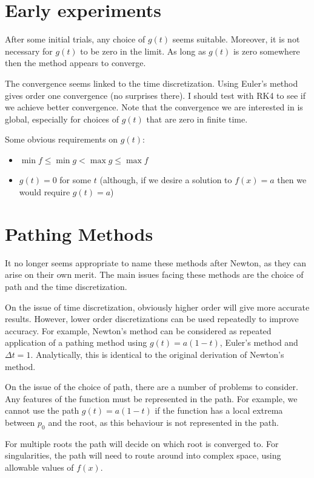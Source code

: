 \documentclass{book}
\begin{document}
\section{Early experiments}

After some initial trials, any choice of $g(t)$ seems suitable.
Moreover, it is not necessary for $g(t)$ to be zero in the limit.
As long as $g(t)$ is zero somewhere then the method appears to converge.

The convergence seems linked to the time discretization.
Using Euler's method gives order one convergence (no surprises there).
I should test with RK4 to see if we achieve better convergence.
Note that the convergence we are interested in is global, especially for choices of $g(t)$ that are zero in finite time.

Some obvious requirements on $g(t)$:
\begin{itemize}
\item $\min f \leq \min g < \max g \leq \max f$
\item $g(t) = 0$ for some $t$ (although, if we desire a solution to $f(x) = a$ then we would require $g(t) = a$)
\end{itemize}

\section{Pathing Methods}

It no longer seems appropriate to name these methods after Newton, as they can arise on their own merit.
The main issues facing these methods are the choice of path and the time discretization.

On the issue of time discretization, obviously higher order will give more accurate results.
However, lower order discretizations can be used repeatedly to improve accuracy.
For example, Newton's method can be considered as repeated application of a pathing method using $g(t) = a (1-t)$, Euler's method and $\Delta t=1$.
Analytically, this is identical to the original derivation of Newton's method.

On the issue of the choice of path, there are a number of problems to consider.
Any features of the function must be represented in the path.
For example, we cannot use the path $g(t) = a (1-t)$ if the function has a local extrema between $p_0$ and the root, as this behaviour is not represented in the path.

For multiple roots the path will decide on which root is converged to.
For singularities, the path will need to route around into complex space, using allowable values of $f(x)$.
\end{document}
